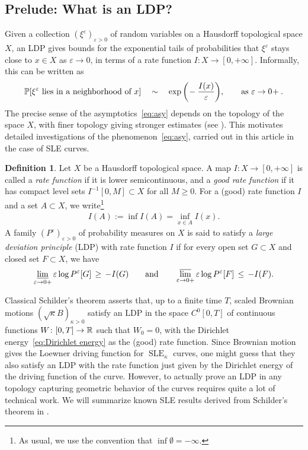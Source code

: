 \documentclass[a4paper, 11pt]{article}
\theoremstyle{definition}
\newtheorem{df}[thm]{Definition}
\numberwithin{equation}{section}
\numberwithin{figure}{section}
\renewcommand{\liminf}{\varliminf}
\renewcommand{\limsup}{\varlimsup}
\newcommand{\SLE}[1][]{\operatorname{SLE}_{#1}}
\newcommand{\funs}[2][]{C^{0}_{#1}[0,#2}
\begin{document}
\subsection{Prelude: What is an LDP?}

Given a collection $(\xi^\varepsilon)_{\varepsilon > 0}$ of random variables on a Hausdorff topological space $X$, 
an LDP gives bounds for the exponential tails of probabilities that $\xi^\varepsilon$ stays close to $x \in X$ as $\varepsilon \to 0$,
in terms of a rate function $I \colon X \to [0,+\infty]$. 
Informally, this can be written as
\begin{align} \label{eq:asy}
\mathbb{P}[\xi^\varepsilon \textnormal{ lies in a neighborhood of } x] \quad \sim \quad 
\exp\bigg(\! -\frac{I(x)}{\varepsilon}\bigg), \qquad \textnormal{as } \varepsilon \to 0\!+.
\end{align}
The precise sense of the asymptotics~\eqref{eq:asy} depends on the topology of the space $X$, 
with finer topology giving stronger estimates (see ). 
This motivates detailed investigations of the phenomenon~\eqref{eq:asy},
carried out in this article in the case of SLE curves. 

\begin{df} \label{def:LDP}
Let $X$ be a Hausdorff topological space. A map $I \colon X \to [0,+\infty]$ is called 
a \emph{rate function} if it is lower semicontinuous, 
and a \emph{good rate function} if it has compact level sets $I^{-1}[0,M] \subset X$ for all $M \geq 0$. 
For a (good) rate function $I$ and a set $A \subset X$, we write\footnote{As usual, we use the convention that $\inf\emptyset = -\infty$.}
\begin{align*}
I(A) := \inf I(A) = \inf_{x \in A}I(x) .
\end{align*}
A family $(P^\varepsilon)_{\varepsilon>0}$ of probability measures on $X$ is said to satisfy a \emph{large deviation principle} (LDP) with rate function $I$ 
if for every open set $G \subset X$ and closed set $F \subset X$, we have
\begin{align*}
\liminf_{\varepsilon \to 0+}\varepsilon \log P^\varepsilon[G] \, \ge \, - I(G) 
\qquad \textnormal{and} \qquad 
\limsup_{\varepsilon \to 0+}\varepsilon \log P^\varepsilon[F] \, \le \, - I(F).
\end{align*}
\end{df}

Classical Schilder's theorem asserts that, up to a finite time $T$, 
scaled Brownian motions $(\sqrt{\kappa}B)_{\kappa > 0}$ satisfy an LDP 
in the space $\funs{T]}$ of continuous functions 
$W \colon [0,T] \to \mathbb{R}$ such that $W_0 = 0$, 
with the Dirichlet energy~\eqref{eq:Dirichlet energy} as the (good) rate function. 
Since Brownian motion gives the Loewner driving function for $\SLE[\kappa]$ curves, 
one might guess that they also satisfy an LDP with the rate function 
just given by the Dirichlet energy of the driving function of the curve.
However, to actually prove an LDP in any topology capturing geometric behavior of the curves requires quite a lot of technical work. 
We will summarize known SLE results derived from Schilder's theorem in .
\end{document}
